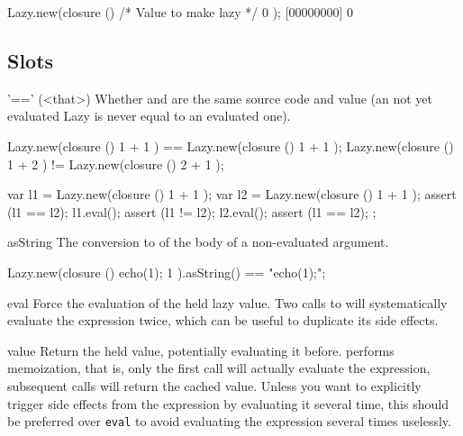 \begin{urbiscript}
Lazy.new(closure () { /* Value to make lazy */ 0 });
[00000000] 0
\end{urbiscript}

\subsection{Slots}

\begin{urbiscriptapi}
\item['=='](<that>)%
  Whether \this and  are the same source code and value (an not
  yet evaluated Lazy is never equal to an evaluated one).
\begin{urbiassert}
Lazy.new(closure () { 1 + 1 }) == Lazy.new(closure () { 1 + 1 });
Lazy.new(closure () { 1 + 2 }) != Lazy.new(closure () { 2 + 1 });
\end{urbiassert}
\begin{urbiscript}
{
  var l1 = Lazy.new(closure () { 1 + 1 });
  var l2 = Lazy.new(closure () { 1 + 1 });
  assert (l1 == l2);
  l1.eval();
  assert (l1 != l2);
  l2.eval();
  assert (l1 == l2);
};
\end{urbiscript}


\item[asString]
  The conversion to  of the body of a non-evaluated
  argument.
\begin{urbiassert}
Lazy.new(closure () { echo(1); 1 }).asString() == "echo(1);";
\end{urbiassert}


\item[eval]%
  Force the evaluation of the held lazy value. Two calls to 
  will systematically evaluate the expression twice, which can be useful to
  duplicate its side effects.


\item[value]%
  Return the held value, potentially evaluating it before. 
  performs memoization, that is, only the first call will actually evaluate
  the expression, subsequent calls will return the cached value. Unless you
  want to explicitly trigger side effects from the expression by evaluating
  it several time, this should be preferred over \lstinline|eval| to avoid
  evaluating the expression several times uselessly.
\end{urbiscriptapi}



